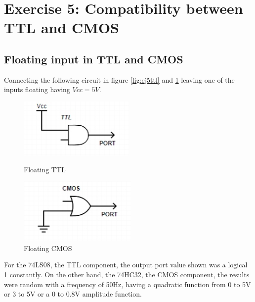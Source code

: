 %

%

%
%
%

\section{\color{olive}Exercise 5: Compatibility between TTL and CMOS}

\subsection{\color{purple}Floating input in TTL and CMOS}

Connecting the following circuit in figure \ref{fig:ej5ttl} and \ref{fig:ej5cmos} leaving one of the inputs floating having $Vcc = 5V$. 

\begin{figure}[h!]
         \begin{minipage}{.47\linewidth}
        \centering
        \includegraphics[width=.6\linewidth]{../Exercise5/TTL5.png}
        \caption{\color{cyan}Floating TTL}
        \label{fig:ej5ttl}
        \end{minipage}
         \begin{minipage}{.5\linewidth}
        \centering
        \includegraphics[width=.5\linewidth]{../Exercise5/CMOS5.png}
        \caption{\color{cyan}Floating CMOS}
        \label{fig:ej5cmos}
    \end{minipage}
\end{figure}

For the 74LS08, the TTL component, the output port value shown was a logical 1 constantly. On the other hand, the 74HC32, the CMOS component, the results were random with a frequency of 50Hz, having a quadratic function from 0 to 5V or 3 to 5V or a 0 to 0.8V amplitude function.

